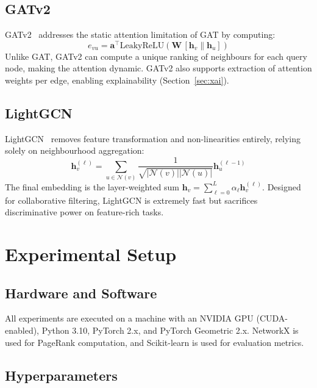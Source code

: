 \documentclass[12pt,a4paper]{article}
\begin{document}
\subsection{GATv2}

GATv2~\cite{brody2022} addresses the static attention limitation of GAT by computing:
\begin{equation}
e_{vu} = \mathbf{a}^\top \text{LeakyReLU}\!\left(\mathbf{W}\,[\mathbf{h}_v \| \mathbf{h}_u]\right)
\end{equation}
Unlike GAT, GATv2 can compute a unique ranking of neighbours for each query node, making the attention dynamic. GATv2 also supports extraction of attention weights per edge, enabling explainability (Section~\ref{sec:xai}).

\subsection{LightGCN}

LightGCN~\cite{he2020} removes feature transformation and non-linearities entirely, relying solely on neighbourhood aggregation:
\begin{equation}
\mathbf{h}_v^{(\ell)} = \sum_{u \in \mathcal{N}(v)} \frac{1}{\sqrt{|\mathcal{N}(v)||\mathcal{N}(u)|}} \mathbf{h}_u^{(\ell-1)}
\end{equation}
The final embedding is the layer-weighted sum $\mathbf{h}_v = \sum_{\ell=0}^{L} \alpha_\ell \mathbf{h}_v^{(\ell)}$. Designed for collaborative filtering, LightGCN is extremely fast but sacrifices discriminative power on feature-rich tasks.

\section{Experimental Setup}
\label{sec:setup}

\subsection{Hardware and Software}

All experiments are executed on a machine with an NVIDIA GPU (CUDA-enabled), Python 3.10, PyTorch 2.x, and PyTorch Geometric 2.x. NetworkX is used for PageRank computation, and Scikit-learn is used for evaluation metrics.

\subsection{Hyperparameters}
\end{document}

